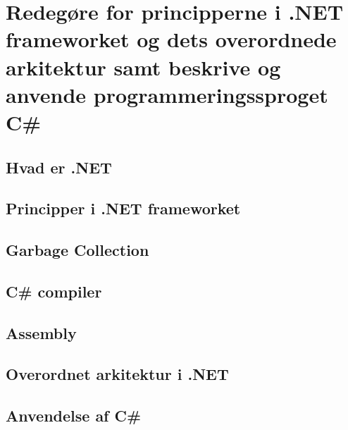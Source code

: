 \section{Redegøre for principperne i .NET frameworket og dets overordnede arkitektur samt beskrive og anvende programmeringssproget C\#}\label{sec:spm1}

\subsection{Hvad er .NET}



\subsection{Principper i .NET frameworket}


\subsection{Garbage Collection}

\subsection{C\# compiler}

\subsection{Assembly}

\subsection{Overordnet arkitektur i .NET}

\subsection{Anvendelse af C\#}